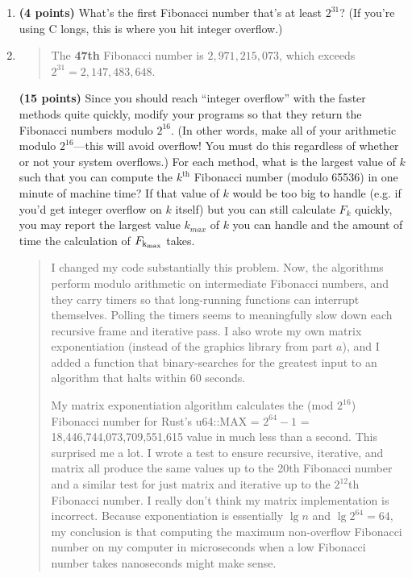 \documentclass[11pt]{article}
\begin{document}
\begin{enumerate}[leftmargin=*]
\begin{enumerate}
\begin{quote}
  \medskip
  And new times. My matrix implementation and iterative are the same here, but the difference is at the nanosecond level, so asymptotic behavior is much more effectively approximated by the 16 second tests.
  \begin{itemize}
    \item Recursive: 15.025ms
    \item Iterative: 125ns
    \item Matrix (mine): 125ns
    \item Matrix (nalgebra crate): 83ns
  \end{itemize}
\end{quote}
\item
{\bf (4 points)}
What's the first Fibonacci number that's at least $2^{31}$? (If you're using C longs, this is where you hit
integer overflow.)
\item
  \begin{quote}
    \color{purple}
  The \textbf{47th} Fibonacci number is $2,971,215,073$, which exceeds $2^{31} = 2,147,483,648$. 
  \end{quote}
{\bf (15 points)}
Since you should reach ``integer overflow'' with the faster methods quite quickly, modify your programs
so that they return the Fibonacci numbers modulo $2^{16}$. (In other words, make all of your
arithmetic modulo $2^{16}$---this will avoid overflow! You must do this regardless of whether or not your
system overflows.) For each method, what is the largest value of $k$ such that you can compute the
$k^\text{th}$ Fibonacci number (modulo 65536) in one minute of machine time? If that value of $k$ would be too big to handle (e.g. if you'd get integer overflow on $k$ itself) but you can still calculate $F_{k}$ quickly, you may report the largest value $k_{max}$ of $k$ you can handle and the amount of time the calculation of $F_{\rm k_{max}}$ takes. 
\begin{quote}
  \color{purple}
  I changed my code substantially this problem. Now, the algorithms perform modulo arithmetic on intermediate Fibonacci numbers, and they carry timers so that long-running functions can interrupt themselves. Polling the timers seems to meaningfully slow down each recursive frame and iterative pass. I also wrote my own matrix exponentiation (instead of the graphics library from part $a$), and I added a function that binary-searches for the greatest input to an algorithm that halts within 60 seconds. 

  \medskip
  My matrix exponentiation algorithm calculates the (mod $2^{16}$) Fibonacci number for Rust's u64::MAX = $2^{64} - 1$ = 18,446,744,073,709,551,615 value in much less than a second. This surprised me a lot. I wrote a test to ensure recursive, iterative, and matrix all produce the same values up to the 20th Fibonacci number and a similar test for just matrix and iterative up to the $2^{12}$th Fibonacci number. I really don't think my matrix implementation is incorrect. Because exponentiation is essentially $\lg n$ and $\lg 2^{64} = 64$, my conclusion is that computing the maximum non-overflow Fibonacci number on my computer in microseconds when a low Fibonacci number takes nanoseconds might make sense.


\end{quote}
\end{enumerate}
\end{enumerate}
\end{document}
